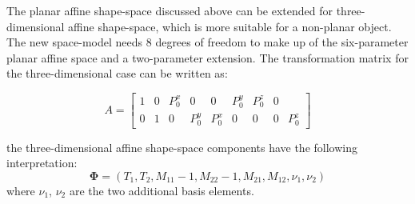 The planar affine shape-space discussed above can be extended for
three-dimensional affine shape-space, which is more suitable for a
non-planar object. The new space-model needs 8 degrees of  freedom to
make up of the six-parameter planar affine space and a two-parameter
extension. The transformation matrix for the three-dimensional case
can be written as:

\begin{equation}
  \label{eq:4.20}
  A =
  \begin{bmatrix}
    1 & 0 & P_0^x & 0 & 0 & P_0^y & P_0^z & 0\\
    0 & 1 & 0 & P_0^y & P_0^x & 0 & 0 & 0 & P_0^z
  \end{bmatrix}  
\end{equation}

the three-dimensional affine shape-space components have
the following interpretation:
\begin{equation}
  \label{eq:4.19}
  \mathbf{\Phi} =  (T_1, T_2, M_{11} - 1, M_{22} - 1, M_{21}, M_{12},
  \nu_1, \nu_2)
\end{equation}
where $\nu_1$, $\nu_2$ are the two additional basis elements.








